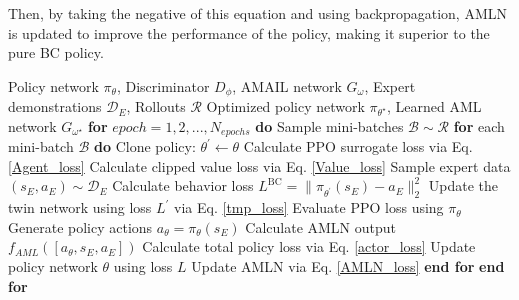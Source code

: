 \documentclass[lettersize,journal]{IEEEtran}
\begin{document}
Then, by taking the negative of this equation and using backpropagation, AMLN is updated to improve the performance of the policy, making it superior to the pure BC policy.
\begin{algorithm}[H]
\caption{algorithm of AMLN}\label{alg:AML}
\begin{algorithmic}[1]
\REQUIRE Policy network $\pi_\theta$, Discriminator $D_\phi$, AMAIL network $G_\omega$, Expert demonstrations $\mathcal{D}_E$, Rollouts $\mathcal{R}$
\ENSURE Optimized policy network $\pi_{\theta^\star}$, Learned AML network $G_{\omega^\star}$
\STATE \textbf{for} $epoch = 1,2,...,N_{epochs}$ \textbf{do}
\STATE \hspace{0.5cm}Sample mini-batches $\mathcal{B} \sim \mathcal{R} $
\STATE \hspace{0.5cm}\textbf{for} each mini-batch $\mathcal{B}$ \textbf{do}
\STATE \hspace{1cm}Clone policy: $\theta^{\prime}\leftarrow \theta$
\STATE \hspace{1cm}Calculate PPO surrogate loss via Eq. \eqref{Agent_loss}
\STATE \hspace{1cm}Calculate clipped value loss via Eq. \eqref{Value_loss}
\STATE \hspace{1cm}Sample expert data $(s_E,a_E) \sim \mathcal{D}_E$
\STATE \hspace{1cm}Calculate behavior loss $L^{\text{BC}}=\lVert \pi_{\theta^{\prime}}(s_E)-a_E \rVert_2^2$
\STATE \hspace{1cm}Update the twin network using loss $L^{\prime}$ via Eq. \eqref{tmp_loss}
\STATE \hspace{1cm}Evaluate PPO loss using $\pi_{\theta}$
\STATE \hspace{1cm}Generate policy actions $a_\theta=\pi_\theta(s_E)$
\STATE \hspace{1cm}Calculate AMLN output $f_{AML}([a_\theta,s_E,a_E])$
\STATE \hspace{1cm}Calculate total policy loss via Eq. \eqref{actor_loss}
\STATE \hspace{1cm}Update policy network $\theta$ using loss $L$
\STATE \hspace{1cm}Update AMLN via Eq. \eqref{AMLN_loss}
\STATE \hspace{0.5cm}\textbf{end for}
\STATE \textbf{end for}
\end{algorithmic}
\label{alg1}
\end{algorithm}
\end{document}
